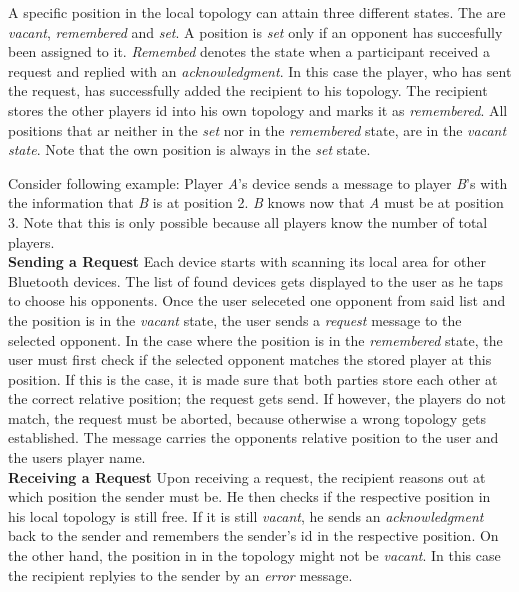 \documentclass{report}
\begin{document}
A specific position in the local topology can attain three different states. The are \textit{vacant}, \textit{remembered} and \textit{set}. A position is \textit{set} only if an opponent has succesfully been assigned to it. \textit{Remembed} denotes the state when a participant received a request and replied with an \textit{acknowledgment}. In this case the player, who has sent the request, has successfully added the recipient to his topology. The recipient stores the other players id into his own topology and marks it as \textit{remembered}. All positions that ar neither in the \textit{set} nor in the \textit{remembered} state, are in the \textit{vacant state}. Note that the own position is always in the \textit{set} state.

Consider following example: Player \textit{A}'s device sends a message to player \textit{B}'s with the information that \textit{B} is at position 2. \textit{B} knows now that \textit{A} must be at position 3. Note that this is only possible because all players know the number of total players.\\

\textbf{Sending a Request} Each device starts with scanning its local area for other Bluetooth devices. The list of found devices gets displayed to the user as he taps to choose his opponents. Once the user seleceted one opponent from said list and the position is in the \textit{vacant} state, the user sends a \textit{request} message to the selected opponent. In the case where the position is in the \textit{remembered} state, the user must first check if the selected opponent matches the stored player at this position. If this is the case, it is made sure that both parties store each other at the correct relative position; the request gets send. If however, the players do not match, the request must be aborted, because otherwise a wrong topology gets established. The message carries the opponents relative position to the user and the users player name.\\

\textbf{Receiving a Request} Upon receiving a request, the recipient reasons out at which position the sender must be. He then checks if the respective position in his local topology is still free. If it is still \textit{vacant}, he sends an \textit{acknowledgment} back to the sender and remembers the sender's id in the respective position. On the other hand, the position in in the topology might not be \textit{vacant}. In this case the recipient replyies to the sender by an \textit{error} message.\\
\end{document}
